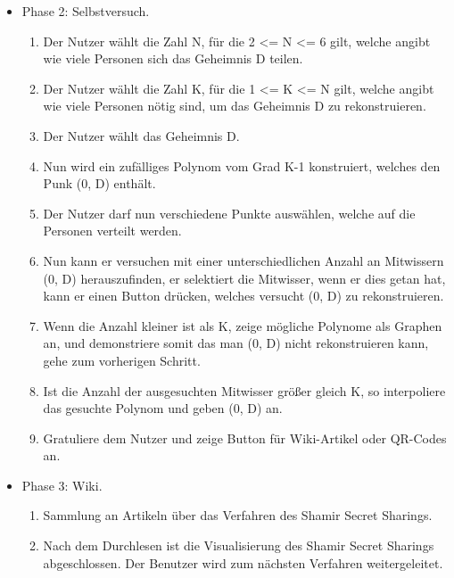 \documentclass{article}
\begin{document}
\begin{itemize}[label={}]
 \item Phase 2: Selbstversuch.

	\begin{enumerate}
     \item Der Nutzer wählt die Zahl N,
        für die 2 <= N <= 6 gilt, welche
        angibt wie viele Personen sich das
        Geheimnis D teilen.
     \item Der Nutzer wählt die Zahl K,
        für die 1 <= K <= N gilt, welche
        angibt wie viele Personen nötig
        sind, um das Geheimnis D zu
        rekonstruieren.
     \item Der Nutzer wählt das Geheimnis D.
     \item Nun wird ein zufälliges Polynom
        vom Grad K-1 konstruiert, welches
        den Punk (0, D) enthält.
     \item Der Nutzer darf nun verschiedene
        Punkte auswählen, welche auf
        die Personen verteilt werden.
     \item Nun kann er versuchen mit
        einer unterschiedlichen Anzahl
        an Mitwissern (0, D)
        herauszufinden, er selektiert
        die Mitwisser, wenn er dies
        getan hat, kann er einen
        Button drücken, welches
        versucht (0, D) zu rekonstruieren.
     \item Wenn die Anzahl kleiner ist als
        K, zeige mögliche Polynome als
        Graphen an, und demonstriere somit
        das man (0, D) nicht rekonstruieren
        kann, gehe zum vorherigen Schritt.
     \item Ist die Anzahl der ausgesuchten
        Mitwisser größer gleich K, so
        interpoliere das gesuchte Polynom
        und geben (0, D) an.
     \item Gratuliere dem Nutzer und
        zeige Button für Wiki-Artikel
        oder QR-Codes an.
	\end{enumerate}

 \item Phase 3: Wiki.

	\begin{enumerate}
	 \item Sammlung an Artikeln über das Verfahren des Shamir Secret Sharings.
	 \item Nach dem Durchlesen ist die Visualisierung des Shamir Secret Sharings abgeschlossen. Der Benutzer wird zum nächsten Verfahren weitergeleitet.
 	\end{enumerate}

\end{itemize}
\end{document}

